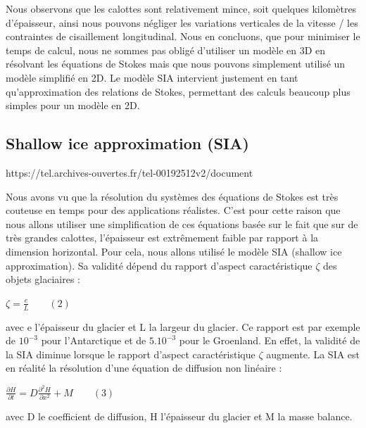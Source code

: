 \documentclass{article}
\begin{document}
Nous observons que les calottes sont relativement mince, soit quelques kilomètres d'épaisseur, ainsi nous pouvons négliger les variations verticales de la vitesse / les contraintes de cisaillement longitudinal. Nous en concluons, que pour minimiser le temps de calcul, nous ne sommes pas obligé d'utiliser un modèle en 3D en résolvant les équations de Stokes mais que nous pouvons simplement utilisé un modèle simplifié en 2D. Le modèle SIA intervient justement en tant qu’approximation des relations de Stokes, permettant des calculs beaucoup plus simples pour un modèle en 2D.

 
\subsection{Shallow ice approximation (SIA)}
https://tel.archives-ouvertes.fr/tel-00192512v2/document

Nous avons vu que la résolution du systèmes des équations de Stokes est très couteuse en temps pour des applications réalistes. C'est pour cette raison que nous allons utiliser une simplification de ces équations basée sur le fait que sur de très grandes calottes, l'épaisseur est extrêmement faible par rapport à la dimension horizontal. Pour cela, nous allons utilisé le modèle SIA (shallow ice approximation). Sa validité dépend du rapport d'aspect caractéristique $\zeta$ des objets glaciaires :
\begin{center}
$\zeta = \frac{e}{L} \qquad(2)$
\end{center}

avec e l'épaisseur du glacier et L la largeur du glacier. Ce rapport est par exemple de $10^{-3}$ pour l'Antarctique et de $5.10^{-3}$ pour le Groenland. En effet, la validité de la SIA diminue lorsque le rapport d'aspect caractéristique $\zeta$ augmente. 
La SIA est en réalité la résolution d'une équation de diffusion non linéaire : 


\begin{center}
$\frac{\partial H}{\partial t}=D\frac{{\partial}^{2}H}{\partial x^{2}} + M\qquad(3)$
\end{center}

avec D le coefficient de diffusion, H l'épaisseur du glacier et M la masse balance.
\\
\end{document}
